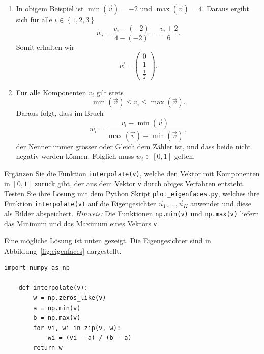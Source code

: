 \begin{losung*}
	\phantom{text}
	\begin{enumerate}[label=(\alph*)]
		\item In obigem Beispiel ist $\min\left(\vec v\right)=-2$ und $\max\left(\vec v\right)=4$.
		Daraus ergibt sich für alle $i\in\left\{1,2,3\right\}$
		\begin{equation*}
			w_i=\frac{v_i-\left(-2\right)}{4-\left(-2\right)}=\frac{v_i+2}{6}.
		\end{equation*}
		Somit erhalten wir
		\begin{equation*}
			\vec w=
			\begin{pmatrix}
				0 \\
				1 \\
				\tfrac{1}{2}
			\end{pmatrix}.
		\end{equation*}
		\item Für alle Komponenten $v_i$ gilt stets
		\begin{equation*}
			\min\left(\vec v\right)\leq v_i\leq\max\left(\vec v\right).
		\end{equation*}
		Daraus folgt, dass im Bruch
		\begin{equation*}
			w_i=\frac{v_i-\min\left(\vec v\right)}{\max\left(\vec v\right)-\min\left(\vec v\right)},
		\end{equation*}
		der Nenner immer grösser oder Gleich dem Zähler ist, und dass beide nicht negativ werden können.
		Folglich muss $w_i\in\left[0,1\right]$ gelten.
	\end{enumerate}
\end{losung*}
\begin{aufgabe}
	Ergänzen Sie die Funktion \texttt{interpolate(v)}, welche den Vektor mit Komponenten in $\left[0,1\right]$ zurück gibt, der aus dem Vektor \texttt{v} durch obiges Verfahren entsteht.
	Testen Sie ihre Lösung mit dem Python Skript \texttt{plot\_eigenfaces.py}, welches ihre Funktion \texttt{interpolate(v)} auf die Eigengesichter $\vec u_1,\ldots,\vec u_K$ anwendet und diese als Bilder abspeichert.
	\textit{Hinweis:} Die Funktionen \texttt{np.min(v)} und \texttt{np.max(v)} liefern das Minimum und das Maximum eines Vektors \texttt{v}.
\end{aufgabe}
\begin{losung*}
	Eine mögliche Lösung ist unten gezeigt.
	Die Eigengesichter sind in Abbildung~\ref{fig:eigenfaces} dargestellt.
\begin{lstlisting}[style=python]
	import numpy as np
	
	def interpolate(v):
		w = np.zeros_like(v)
		a = np.min(v)
		b = np.max(v)
		for vi, wi in zip(v, w):
			wi = (vi - a) / (b - a)
		return w
\end{lstlisting}
\end{losung*}

